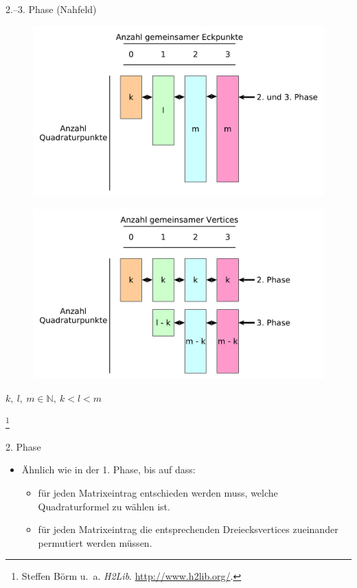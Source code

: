 \documentclass[10pt]{beamer}
\let\svthefootnote\thefootnote
\begin{document}
\begin{frame}{2.--3. Phase (Nahfeld)}
  \begin{overprint}
      \begin{figure}
        \centering
        \includegraphics[width=.9\linewidth]{figures/fg-nf-quad-points.pdf}
      \end{figure}
      \begin{figure}
        \centering
        \includegraphics[width=.9\linewidth]{figures/fg-nf-quad-points-div.pdf}
      \end{figure}
  \end{overprint}

  \centerline{\( k, \ l, \ m \in \mathbb{N}, \ k < l < m\)}

  \footnotesize
  \let\thefootnote\relax\footnote{Steffen Börm u.\ a. \textit{H2Lib}.
  \url{http://www.h2lib.org/}.}
  \addtocounter{footnote}{-1}\let\thefootnote\svthefootnote\relax
  \normalsize
\end{frame}

\begin{frame}{2. Phase}
  \begin{itemize}
    \item \"Ahnlich wie in der 1. Phase, bis auf dass:
    \begin{itemize}
      \item f\"ur jeden Matrixeintrag entschieden werden muss, welche
            Quadraturformel zu wählen ist.
      \item f\"ur jeden Matrixeintrag die entsprechenden Dreiecksvertices
            zueinander permutiert werden müssen.
    \end{itemize}
  \end{itemize}
\end{frame}
\end{document}
